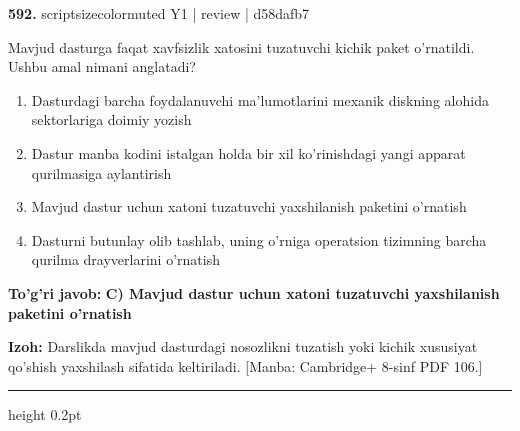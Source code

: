 \documentclass[10pt,a4paper]{article}
\begin{document}
{\bfseries\sffamily\color{ink} 592.} {scriptsizecolor{muted} Y1 | review | d58dafb7}
\par
Mavjud dasturga faqat xavfsizlik xatosini tuzatuvchi kichik paket o'rnatildi. Ushbu amal nimani anglatadi?
\begin{enumerate}[label=\Alph*),leftmargin=9mm]
\item Dasturdagi barcha foydalanuvchi ma'lumotlarini mexanik diskning alohida sektorlariga doimiy yozish
\item Dastur manba kodini istalgan holda bir xil ko'rinishdagi yangi apparat qurilmasiga aylantirish
\item Mavjud dastur uchun xatoni tuzatuvchi yaxshilanish paketini o'rnatish
\item Dasturni butunlay olib tashlab, uning o'rniga operatsion tizimning barcha qurilma drayverlarini o'rnatish
\end{enumerate}
\begin{tcolorbox}[enhanced,breakable,colback=teal!4,colframe=teal!60!black,boxrule=0.45pt,arc=1.2mm,left=2.7mm,right=2.7mm,top=1.8mm,bottom=1.8mm,before skip=2mm,after skip=2mm]
{\bfseries\sffamily\color{teal}To'g'ri javob:} \textbf{C) Mavjud dastur uchun xatoni tuzatuvchi yaxshilanish paketini o'rnatish}
\par\smallskip
{\bfseries Izoh:} Darslikda mavjud dasturdagi nosozlikni tuzatish yoki kichik xususiyat qo'shish yaxshilash sifatida keltiriladi. [Manba: Cambridge+ 8-sinf PDF 106.]
\end{tcolorbox}
\vspace{2mm}\hrule height 0.2pt\vspace{3mm}
\end{document}
